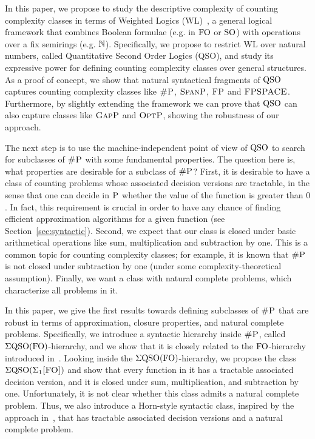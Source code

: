 In this paper, we propose to study the descriptive complexity of counting complexity classes in terms of Weighted Logics (WL)~\cite{DrosteG07}, a general logical framework that combines Boolean formulae (e.g. in ${\rm FO}$ or ${\rm SO}$) with operations over a fix semirings (e.g. $\mathbb{N}$). 
Specifically, we propose to restrict WL over natural numbers, called Quantitative Second Order Logics (QSO), and study its expressive power for defining counting complexity classes over general structures. 
As a proof of concept, we show that natural syntactical fragments of ${\rm QSO}$ captures counting complexity classes like $\text{\sc \#P}$, $\text{\sc SpanP}$, $\text{\sc FP}$ and $\text{\sc FPSPACE}$.
Furthermore, by slightly extending the framework we can prove that ${\rm QSO}$ can also capture classes like $\text{\sc GapP}$ and $\text{\sc OptP}$, showing the robustness of our approach.

The next step is to use the machine-independent point of view of ${\rm QSO}$ to search for subclasses of $\text{\sc \#P}$ with some fundamental properties.
The question here is, what properties are desirable for a subclass of $\text{\sc \#P}$?
First, it is desirable to have a class of counting problems whose associated decision versions are tractable, in the sense that one can decide in $\text{\sc P}$ whether the value of the function is greater than $0$. 
In fact, this requirement is crucial in order to have any chance of finding efficient approximation algorithms for a given function (see Section~\ref{sec:syntactic}).
Second, we expect that our class is closed under basic arithmetical operations like sum, multiplication and subtraction by one. 
This is a common topic for counting complexity classes; for example, it is known that $\text{\sc \#P}$ is not closed under subtraction by one (under some complexity-theoretical assumption). 
Finally, we want a class with natural complete problems, which characterize all problems in it.

In this paper, we give the first results towards defining subclasses of $\text{\sc \#P}$ that are robust in terms of approximation, closure properties, and natural complete problems. 
Specifically, we introduce a syntactic hierarchy inside $\text{\sc \#P}$, called $\Sigma{\rm QSO}({\rm FO})$-hierarchy, and we show that it is closely related to the ${\rm FO}$-hierarchy introduced in~\cite{SalujaST95}. 
Looking inside the $\Sigma{\rm QSO}({\rm FO})$-hierarchy, we propose the class $\Sigma{\rm QSO}(\Sigma_{1}\textsc{[FO]})$ and show that every function in it has a tractable associated decision version, and it is closed under sum, multiplication, and subtraction by one.
Unfortunately, it is not clear whether this class admits 
a natural complete problem.
Thus, 
we also introduce a Horn-style syntactic class, inspired by the approach in~\cite{G92}, that has tractable associated decision versions and a natural complete problem.

